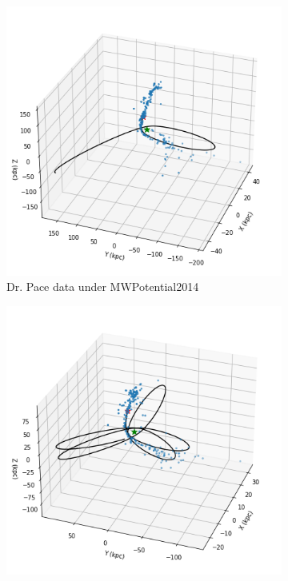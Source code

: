 \documentclass[12pt]{article}
\begin{document}
\begin{figure}[H]
\begin{subfigure}{.45\textwidth}
  \includegraphics[width=\linewidth]{MWPot2014_orbit_AP6D.png}
  \caption{Dr. Pace data under MWPotential2014}
  \label{fig:1.2}
\end{subfigure}
\begin{subfigure}{.45\textwidth}
  \centering
  \includegraphics[width=\linewidth]{MWPot2014x2_orbit_AP6D.png}

\end{subfigure}
\end{figure}
\end{document}
